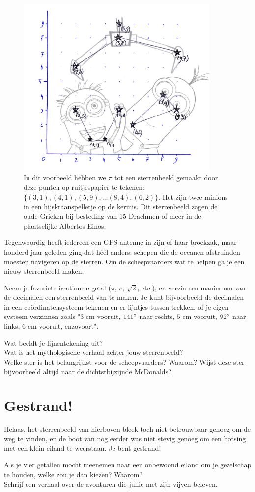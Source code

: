 \documentclass{weekprobleem}
\newcommand{\textgreek}[1]{\begingroup\fontencoding{LGR}\selectfont#1\endgroup}
\begin{document}
\begin{figure}
	\centering
	\includegraphics[width=10cm]{pi}
	\caption{\small{In dit voorbeeld hebben we $\pi$ tot een sterrenbeeld gemaakt door deze punten op ruitjespapier te tekenen: $\{(3,1), (4,1), (5,9), \ldots (8,4), (6,2)\}$. Het zijn twee minions in een hijskraanspelletje op de kermis. Dit sterrenbeeld zagen de oude Grieken bij besteding van 15 Drachmen of meer in de plaatselijke \textgreek{Albertos \<Einos}.}}
\end{figure}
Tegenwoordig heeft iedereen een GPS-antenne in zijn of haar broekzak, maar honderd jaar geleden ging dat héél anders: schepen die de oceanen afstruinden moesten navigeren op de sterren.
Om de scheepvaarders wat te helpen ga je een nieuw sterrenbeeld maken.

Neem je favoriete irrationele getal ($\pi$, $e$, $\sqrt{2}$, etc.), en verzin een manier om van de decimalen een sterrenbeeld van te maken.
Je kunt bijvoorbeeld de decimalen in een coördinatensysteem tekenen en er lijntjes tussen trekken, of je eigen systeem verzinnen zoals "$3$ cm vooruit, $141{\degree}$ naar rechts, $5$ cm vooruit, $92{\degree}$ naar links, $6$ cm vooruit, enzovoort".

Wat beeldt je lijnentekening uit?\\
Wat is het mythologische verhaal achter jouw sterrenbeeld?\\
Welke ster is het belangrijkst voor de scheepvaarders? Waarom? Wijst deze ster bijvoorbeeld altijd naar de dichtstbijzijnde McDonalds?


\section*{Gestrand!}

Helaas, het sterrenbeeld van hierboven bleek toch niet betrouwbaar genoeg om de weg te vinden, en de boot van nog eerder was niet stevig genoeg om een botsing met een klein eiland te weerstaan. Je bent gestrand!

Als je vier getallen mocht meenemen naar een onbewoond eiland om je gezelschap te houden, welke zou je dan kiezen? Waarom?\\
Schrijf een verhaal over de avonturen die jullie met zijn vijven beleven.
\end{document}
